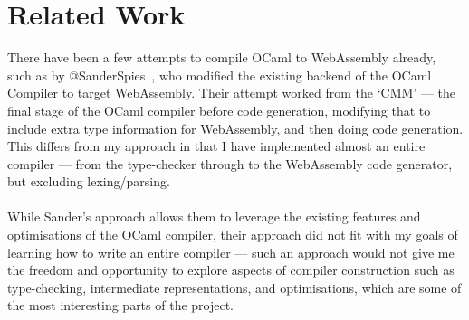 



\section{Related Work}

There have been a few attempts to compile OCaml to WebAssembly already, such as by @SanderSpies~\cite{Awbfo}, who modified the existing backend of the OCaml Compiler to target WebAssembly. Their attempt worked from the `CMM' --- the final stage of the OCaml compiler before code generation, modifying that to include extra type information for WebAssembly, and then doing code generation. This differs from my approach in that I have implemented almost an entire compiler --- from the type-checker through to the WebAssembly code generator, but excluding lexing/parsing.
\\\\
While Sander's approach allows them to leverage the existing features and optimisations of the OCaml compiler, their approach did not fit with my goals of learning how to write an entire compiler --- such an approach would not give me the freedom and opportunity to explore aspects of compiler construction such as type-checking, intermediate representations, and optimisations, which are some of the most interesting parts of the project.